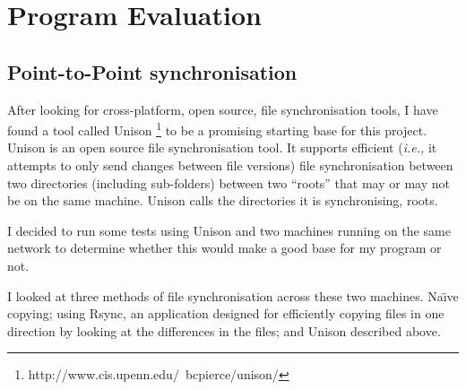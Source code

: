 \documentclass[12pt]{article}
\begin{document}
\section{Program Evaluation}
\subsection{Point-to-Point synchronisation}
After looking for cross-platform, open source, file synchronisation
tools, I have found a tool called Unison
\footnote{http://www.cis.upenn.edu/~bcpierce/unison/}
to be a promising starting
base for this project. Unison is an open source file synchronisation tool.
It supports efficient (\emph{i.e.,} it attempts to only send changes between file versions) file synchronisation between two
directories (including sub-folders) between two ``roots''
that may or may not be on the same machine. Unison calls the
directories it is synchronising, roots.

I decided to run some tests using Unison 
and two machines running on the same network to 
determine whether this would make a good base for
my program or not.

I looked at three methods of file synchronisation across
these two machines. Na\"{\i}ve copying; using Rsync, an application
designed for efficiently copying files in one direction by looking at
the differences in the files; and Unison described above.

\end{document}
